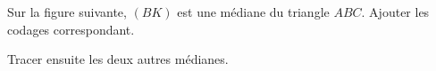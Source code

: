 
\begin{exercice}\label{exosmath-0929}

    Sur la figure suivante, \( (BK)\) est une médiane du triangle \( ABC\). Ajouter les codages correspondant.
\begin{center}
   
\end{center}
Tracer ensuite les deux autres médianes.


\end{exercice}
